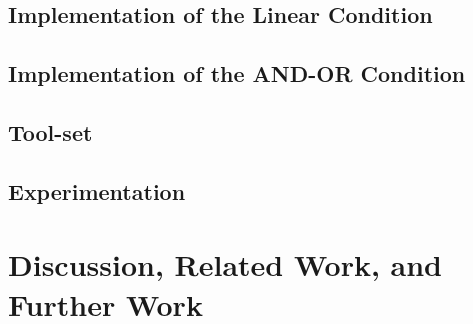\documentclass[prodmode,acmtosem]{acmsmall} %
\begin{document}
   \subsection{Implementation of the Linear Condition}
   \label{s:implLin}
   
   
   \subsection{Implementation of the AND-OR Condition}
   \label{s:implANDOR}
   

   \subsection{Tool-set}
   \label{s:tools}
   

   \subsection{Experimentation}
   \label{s:experiments}
   

\section{Discussion, Related Work, and Further Work}
\label{s:discussion}








%
\end{document}
